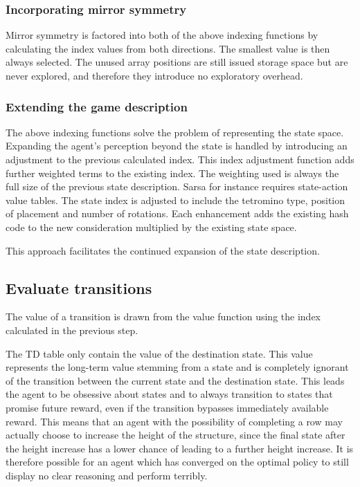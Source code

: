 \documentclass{rucsthesis}
\begin{document}
\subsubsection{Incorporating mirror symmetry}

Mirror symmetry is factored into both of the above indexing functions by calculating the index values from both directions. The smallest value is then always selected. The unused array positions are still issued storage space but are never explored, and therefore they introduce no exploratory overhead.

\subsubsection{Extending the game description}

The above indexing functions solve the problem of representing the state space. Expanding the agent's perception beyond the state is handled by introducing an adjustment to the previous calculated index. This index adjustment function adds further weighted terms to the existing index. The weighting used is always the full size of the previous state description. Sarsa for instance requires state-action value tables. The state index is adjusted to include the tetromino type, position of placement and number of rotations. Each enhancement adds the existing hash code to the new consideration multiplied by the existing state space.

This approach facilitates the continued expansion of the state description. 
 
\subsection{Evaluate transitions}

The value of a transition is drawn from the value function using the index calculated in the previous step.

The TD table only contain the value of the destination state. This value represents the long-term value stemming from a state and is completely ignorant of the transition between the current state and the destination state. This leads the agent to be obsessive about states and to always transition to states that promise future reward, even if the transition bypasses immediately available reward. This means that an agent with the possibility of completing a row may actually choose to increase the height of the structure, since the final state after the height increase has a lower chance of leading to a further height increase. It is therefore possible for an agent which has converged on the optimal policy to still display no clear reasoning and perform terribly. 
\end{document}
